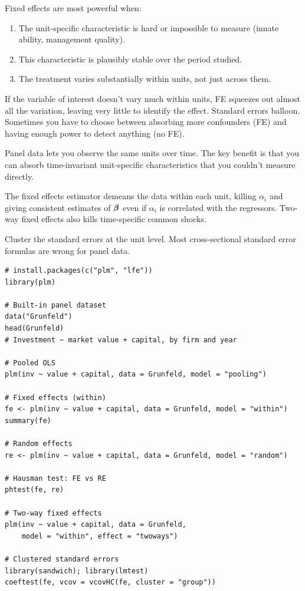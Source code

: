 Fixed effects are most powerful when:
\begin{enumerate}[noitemsep]
\item The unit-specific characteristic is hard or impossible to measure (innate ability, management quality).
\item This characteristic is plausibly stable over the period studied.
\item The treatment varies substantially within units, not just across them.
\end{enumerate}
If the variable of interest doesn't vary much within units, FE squeezes out almost all the variation, leaving very little to identify the effect. Standard errors balloon. Sometimes you have to choose between absorbing more confounders (FE) and having enough power to detect anything (no FE).

\begin{keyinsight}
Panel data lets you observe the same units over time. The key benefit is that you can absorb time-invariant unit-specific characteristics that you couldn't measure directly.

The fixed effects estimator demeans the data within each unit, killing $\alpha_i$ and giving consistent estimates of $\bm{\beta}$ even if $\alpha_i$ is correlated with the regressors. Two-way fixed effects also kills time-specific common shocks.

Cluster the standard errors at the unit level. Most cross-sectional standard error formulas are wrong for panel data.
\end{keyinsight}

\begin{codelab}
\begin{lstlisting}[language=Rlang]
# install.packages(c("plm", "lfe"))
library(plm)

# Built-in panel dataset
data("Grunfeld")
head(Grunfeld)
# Investment ~ market value + capital, by firm and year

# Pooled OLS
plm(inv ~ value + capital, data = Grunfeld, model = "pooling")

# Fixed effects (within)
fe <- plm(inv ~ value + capital, data = Grunfeld, model = "within")
summary(fe)

# Random effects
re <- plm(inv ~ value + capital, data = Grunfeld, model = "random")

# Hausman test: FE vs RE
phtest(fe, re)

# Two-way fixed effects
plm(inv ~ value + capital, data = Grunfeld,
    model = "within", effect = "twoways")

# Clustered standard errors
library(sandwich); library(lmtest)
coeftest(fe, vcov = vcovHC(fe, cluster = "group"))
\end{lstlisting}
\end{codelab}


